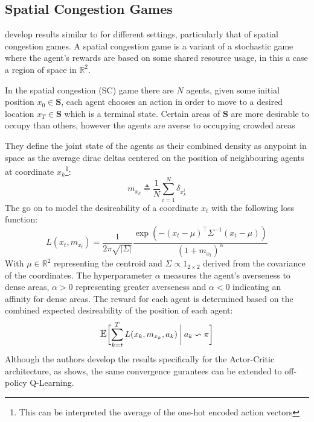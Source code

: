 \subsection{Spatial Congestion Games}
\cite{Mguni2018} develop results similar to \cite{Yang2018} for different settings, particularly that of spatial congestion games.
A spatial congestion game is a variant of a stochastic game where the agent's rewards are based
on some shared resource usage, in this a case a region of space in $\mathbb{R}^2$. 
\begin{displayquote}
    In the spatial congestion (SC) game there are $N$ agents, given some initial position $x_0 \in \mathbf{S}$, each agent
chooses an action in order to move to a desired location $x_T \in \mathbf{S}$ 
which is a terminal state. Certain areas of $\mathbf{S}$ are more desirable to occupy than others, 
however the agents are averse to occupying crowded areas
\end{displayquote}
They define the joint state of the agents as their combined density 
as anypoint in space as the average dirac deltas
centered on the position of neighbouring agents at coordinate $x_k$\footnote{This can be interpreted the average of the one-hot encoded action vectors}:
\begin{equation}
    m_{x_k} \triangleq \frac{1}{N} \sum_{i=1}^N \delta_{x^i_k}
\end{equation}
The go on to model the desireability of a coordinate $x_t$ with the following loss function:
\begin{equation}
    L(x_t, m_{x_t}) = \frac{1}{2 \pi \sqrt{\vert \Sigma \vert}} \frac{\exp (-(x_t - \mu)^\top \Sigma^{-1} (x_t - \mu))}{(1 + m_{x_t})^\alpha}
\end{equation}
With $\mu \in \mathbb{R}^2$ representing the centroid and $\Sigma \propto 1_{2 \times 2}$ derived from the covariance of the coordinates. The hyperparameter $\alpha$ measures the agent's averseness
to dense areas, $\alpha > 0$ representing greater averseness and $\alpha < 0$ indicating an affinity for
dense areas. The reward for each agent is determined based on the combined expected desireability
of the position of each agent:
\begin{equation}
    \E \Condition{\sum_{k=t}^T L(x_k, m_{x_k}, a_k)}{a_k \backsim \pi}
\end{equation}  
Although the authors develop the results specifically for the Actor-Critic architecture,
as \cite{Yang2018} shows, the same convergence gurantees can be extended to off-policy Q-Learning.
